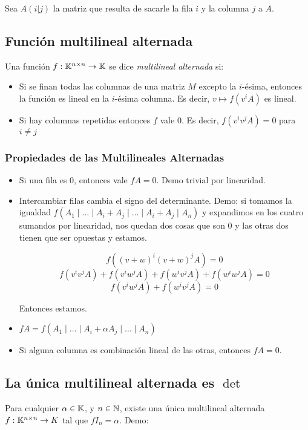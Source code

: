 \documentclass{article}
\begin{document}
Sea $A(i|j)$ la matriz que resulta de sacarle la fila $i$ y la columna $j$ a $A$.

\subsection*{Función multilineal alternada}
Una función $f : \mathbb{K}^{n \times n} \to \mathbb{K}$ se dice \emph{multilineal alternada} si:
\begin{itemize}
	\item Si se finan todas las columnas de una matriz $M$ excepto la $i$-ésima, entonces la función es lineal en la $i$-ésima columna. Es decir, $v \mapsto f (v^iA )$ es lineal.
	\item Si hay columnas repetidas entonces $f$ vale $0$. Es decir, $f (v^iv^jA) = 0$ para $i \neq j$
\end{itemize}

\subsubsection*{Propiedades de las Multilineales Alternadas}
\begin{itemize}
	\item Si una fila es $0$, entonces vale $fA = 0$. Demo trivial por linearidad.
	\item Intercambiar filas cambia el signo del determinante. Demo: si tomamos la igualdad $f(A_1 \mid \dots \mid A_i + A_j \mid \dots \mid A_i + A_j \mid A_n)$ y expandimos en los cuatro sumandos por linearidad, nos quedan dos cosas que son $0$ y las otras dos tienen que ser opuestas y estamos.

		\[f ((v+w)^i(v+w)^jA) = 0\]
	\[f (v^iv^jA) + f (v^iw^jA) + f (w^iv^jA) + f(w^iw^jA) = 0\]
	\[f (v^iw^jA) + f (w^iv^jA) = 0\]

	Entonces estamos.

	\item $fA = f(A_1 \mid \dots \mid A_i + \alpha A_j \mid \dots \mid A_n)$
	\item Si alguna columna es combinación lineal de las otras, entonces $fA = 0$.
\end{itemize}

\subsection*{La única multilineal alternada es $\det$}
Para cualquier $\alpha \in \mathbb{K}$, y $n \in \mathbb{N}$, existe una única multilineal alternada $f : \mathbb{K}^{n \times n} \to K$ tal que $f I_n = \alpha$. Demo:
\end{document}

